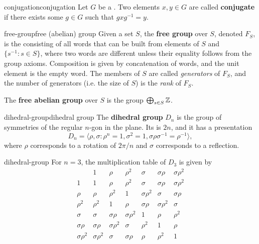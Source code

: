 \begin{topic}{conjugation}{conjugation}
    Let $G$ be a . Two elements $x, y \in G$ are called \textbf{conjugate} if there exists some $g \in G$ such that $g x g^{-1} = y$.
\end{topic}

\begin{topic}{free-group}{free (abelian) group}
    Given a set $S$, the \textbf{free group} over $S$, denoted $F_S$, is the  consisting of all words that can be built from elements of $S$ and $\{ s^{-1} : s \in S \}$, where two words are different unless their equality follows from the group axioms. Composition is given by concatenation of words, and the unit element is the empty word. The members of $S$ are called \textit{generators} of $F_S$, and the number of generators (i.e. the size of $S$) is the \textit{rank} of $F_S$.

    The \textbf{free abelian group} over $S$ is the  group $\bigoplus_{s \in S} \mathbb{Z}$.
\end{topic}

\begin{topic}{dihedral-group}{dihedral group}
    The \textbf{dihedral group} $D_n$ is the group of symmetries of the regular $n$-gon in the plane. Its  is $2n$, and it has a presentation
    \[ D_n = \langle \rho, \sigma : \rho^n = 1, \sigma^2 = 1, \sigma \rho \sigma^{-1} = \rho^{-1} \rangle , \]
    where $\rho$ corresponds to a rotation of $2 \pi / n$ and $\sigma$ corresponds to a reflection.
\end{topic}

\begin{example}{dihedral-group}
    For $n = 3$, the multiplication table of $D_3$ is given by
    \[ \begin{array}{c||c|c|c|c|c|c} 
           & 1 & \rho & \rho^2 & \sigma & \sigma \rho & \sigma \rho^2 \\ \hline \hline
         1 & 1 & \rho & \rho^2 & \sigma & \sigma \rho & \sigma \rho^2 \\ \hline
         \rho & \rho & \rho^2 & 1 & \sigma \rho^2 & \sigma & \sigma \rho \\ \hline
         \rho^2 & \rho^2 & 1 & \rho & \sigma \rho & \sigma \rho^2 & \sigma \\ \hline
         \sigma & \sigma & \sigma \rho & \sigma \rho^2 & 1 & \rho & \rho^2 \\ \hline
         \sigma \rho & \sigma \rho & \sigma \rho^2 & \sigma & \rho^2 & 1 & \rho \\ \hline
         \sigma \rho^2 & \sigma \rho^2 & \sigma & \sigma \rho & \rho & \rho^2 & 1
    \end{array} \]
\end{example}

